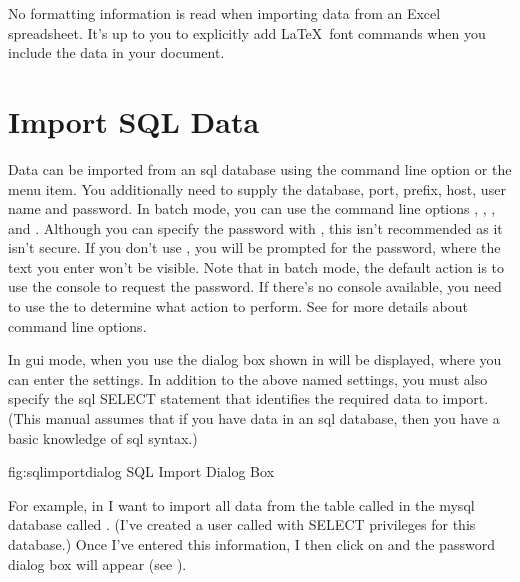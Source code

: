    \begin{information}
   No formatting information is read when importing
   data from an Excel spreadsheet. It's up to you to explicitly
   add \LaTeX\ font commands when you include the data in your
   document.
   \end{information}


\section{Import SQL Data}\label{sec:importsql}

   Data can be imported from an \gls{sql} database using
   the  command line option or the 
    menu item. You additionally need to
   supply the database, port, prefix, host, user name and password. In batch 
   mode, you can use the command line options ,
   , ,  and
   . Although you can specify the password with 
   , this isn't recommended as it isn't secure. 
   If you don't use , 
   you will be prompted for the password, where the text you enter 
   won't be visible. Note that in batch mode, the default action
   is to use the console to request the password. If there's no
console available, you need to use the 
   to determine what action to perform. See  for more details
   about command line options.


   In \gls{gui} mode, when you use 
   the dialog box shown in  will be displayed,
   where you can enter the settings. In addition to the above named settings,
   you must also specify the \gls{sql} SELECT statement that identifies 
   the required data to import. (This manual assumes that if you have
   data in an \gls{sql} database, then you have a basic
   knowledge of \gls{sql} syntax.)

\FloatFig
 {fig:sqlimportdialog}
 {%
 }
 {SQL Import Dialog Box}


   For example, in  I want to import all
   data from the table called  in the \gls{mysql}
   database called . (I've created a user called
    with SELECT privileges for this database.) Once I've 
   entered this information,
   I then click on  and the password
   dialog box will appear (see ).

